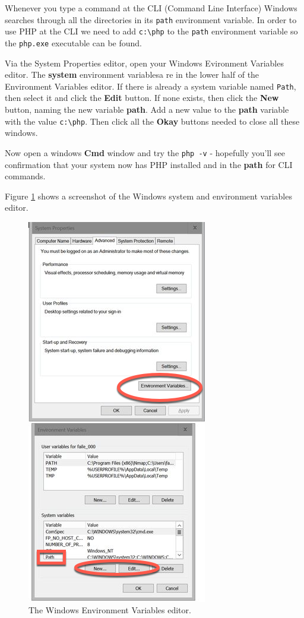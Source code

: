 \documentclass[a4paperpaper,openright]{book}
\begin{document}
Whenever you type a command at the CLI (Command Line Interface) Windows
searches through all the directories in its \texttt{path} environment
variable. In order to use PHP at the CLI we need to add
\texttt{c:\textbackslash{}php} to the \texttt{path} environment variable
so the \texttt{php.exe} executable can be found.

Via the System Properties editor, open your Windows Evironment Variables
editor. The \textbf{system} environment variablesa re in the lower half
of the Environment Variables editor. If there is already a system
variable named \texttt{Path}, then select it and click the \textbf{Edit}
button. If none exists, then click the \textbf{New} button, naming the
new variable \textbf{path}. Add a new value to the \textbf{path}
variable with the value \texttt{c:\textbackslash{}php}. Then click all
the \textbf{Okay} buttons needed to close all these windows.

Now open a windows \textbf{Cmd} window and try the \texttt{php\ -v} -
hopefully you'll see confirmation that your system now has PHP installed
and in the \textbf{path} for CLI commands.

Figure \ref{env2} shows a screenshot of the Windows system and
environment variables editor.

\begin{figure}
\centering
\includegraphics{./tex2pdf.-65f13e14688ab55b/eb1ab9d21c784b824e4103ff64f0448e7b0e6122.png}
\caption{The Windows Environment Variables editor. \label{env2}}
\end{figure}
\end{document}
